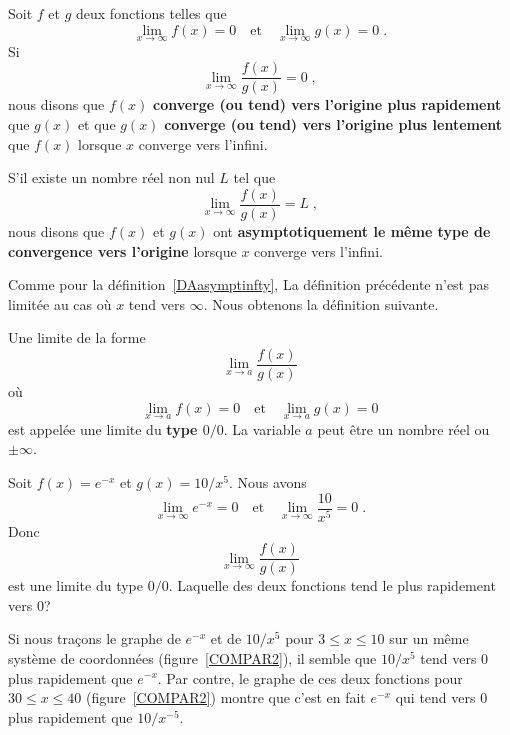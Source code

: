 {\begin{focus}{\dfn} 
Soit $f$ et $g$ deux fonctions telles que
\[
\lim_{x \rightarrow \infty} f(x) = 0 \quad \text{et} \quad
\lim_{x \rightarrow \infty} g(x) = 0 \; .
\]
Si
\[
\lim_{x \rightarrow \infty} \frac{f(x)}{g(x)} = 0 \; ,
\]
nous disons que $f(x)$
{\bfseries converge (ou tend) vers l'origine plus rapidement}
que $g(x)$ et que $g(x)$
{\bfseries converge (ou tend) vers l'origine plus lentement}
que $f(x)$ lorsque $x$ converge vers l'infini.

S'il existe un nombre réel non nul $L$ tel que
\[
\lim_{x \rightarrow \infty} \frac{f(x)}{g(x)} = L \; ,
\]
nous disons que $f(x)$ et $g(x)$ ont {\bfseries asymptotiquement le même
type de convergence vers l'origine} lorsque $x$ converge vers
l'infini.
\end{focus}

Comme pour la définition~\ref{DAasymptinfty}, La définition précédente
n'est pas limitée au cas où $x$ tend vers $\infty$.  Nous obtenons la
définition suivante.

\begin{focus}{\dfn}
Une limite de la forme
\[
\lim_{x \rightarrow a} \frac{f(x)}{g(x)}
\]
où
\[
\lim_{x\rightarrow a} f(x) = 0 \quad \text{et} \quad
\lim_{x\rightarrow a} g(x) = 0
\]
est appelée une limite du {\bfseries type $0/0$}.  La variable $a$
peut être un nombre réel ou $\pm \infty$.
\end{focus}

\begin{egg}
Soit $f(x) = e^{-x}$ et $g(x)= 10/x^5$.  Nous avons
\[
\lim_{x\rightarrow \infty} e^{-x} = 0 \quad \text{et} \quad
\lim_{x\rightarrow \infty} \frac{10}{x^5} = 0 \; .
\]
Donc
\[
\lim_{x \rightarrow \infty} \frac{f(x)}{g(x)}
\]
est une limite du type $0/0$.  Laquelle des deux fonctions tend le
plus rapidement vers $0$? 

Si nous traçons le graphe de $e^{-x}$ et de $10/x^5$ pour
$3\leq x \leq 10$ sur un même système de coordonnées
(figure~\ref{COMPAR2}), il semble que $10/x^5$ tend vers $0$ plus
rapidement que $e^{-x}$.  Par contre, le graphe de ces deux fonctions
pour $30\leq x \leq 40$ (figure~\ref{COMPAR2}) montre que c'est
en fait $e^{-x}$ qui tend vers $0$ plus rapidement que $10/x^{-5}$.


\end{egg}}
